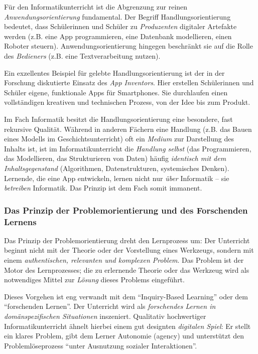 \documentclass[a5paper,pagesize,10pt,bibtotoc,pointlessnumbers,
normalheadings,DIV=9,twoside=false]{scrbook}
\begin{document}
Für den Informatikunterricht ist die Abgrenzung zur reinen \textit{Anwendungsorientierung} fundamental. Der Begriff Handlungsorientierung bedeutet, dass Schülerinnen und Schüler zu \textit{Produzenten} digitaler Artefakte werden (z.B. eine App programmieren, eine Datenbank modellieren, einen Roboter steuern). Anwendungsorientierung hingegen beschränkt sie auf die Rolle des \textit{Bedieners} (z.B. eine Textverarbeitung nutzen).

Ein exzellentes Beispiel für gelebte Handlungsorientierung ist der in der Forschung diskutierte Einsatz des \textit{App Inventors}. Hier erstellen Schülerinnen und Schüler eigene, funktionale Apps für Smartphones. Sie durchlaufen einen vollständigen kreativen und technischen Prozess, von der Idee bis zum Produkt.

Im Fach Informatik besitzt die Handlungsorientierung eine besondere, fast rekursive Qualität. Während in anderen Fächern eine Handlung (z.B. das Bauen eines Modells im Geschichtsunterricht) oft ein \textit{Medium} zur Darstellung des Inhalts ist, ist im Informatikunterricht die \textit{Handlung selbst} (das Programmieren, das Modellieren, das Strukturieren von Daten) häufig \textit{identisch mit dem Inhaltsgegenstand} (Algorithmen, Datenstrukturen, systemisches Denken). Lernende, die eine App entwickeln, lernen nicht nur \textit{über} Informatik -- sie \textit{betreiben} Informatik. Das Prinzip ist dem Fach somit immanent.
    
\subsubsection{Das Prinzip der Problemorientierung und des Forschenden Lernens}

Das Prinzip der Problemorientierung dreht den Lernprozess um: Der Unterricht beginnt nicht mit der Theorie oder der Vorstellung eines Werkzeugs, sondern mit einem \textit{authentischen, relevanten und komplexen Problem}. Das Problem ist der Motor des Lernprozesses; die zu erlernende Theorie oder das Werkzeug wird als notwendiges Mittel zur \textit{Lösung} dieses Problems eingeführt.

Dieses Vorgehen ist eng verwandt mit dem ``Inquiry-Based Learning'' oder dem ``forschenden Lernen''. Der Unterricht wird als \textit{forschendes Lernen in domänspezifischen Situationen} inszeniert. Qualitativ hochwertiger Informatikunterricht ähnelt hierbei einem gut designten \textit{digitalen Spiel}: Er stellt ein klares Problem, gibt dem Lerner Autonomie (agency) und unterstützt den Problemlöseprozess ``unter Ausnutzung sozialer Interaktionen''.
\end{document}
